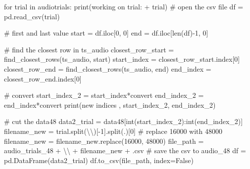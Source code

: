 \documentclass[
  letterpaper,
  DIV=11,
  numbers=noendperiod]{scrreprt}
\newenvironment{Shaded}{\begin{snugshade}}{\end{snugshade}}
\newcommand{\BuiltInTok}[1]{\textcolor[rgb]{0.00,0.23,0.31}{#1}}
\newcommand{\CharTok}[1]{\textcolor[rgb]{0.13,0.47,0.30}{#1}}
\newcommand{\CommentTok}[1]{\textcolor[rgb]{0.37,0.37,0.37}{#1}}
\newcommand{\ControlFlowTok}[1]{\textcolor[rgb]{0.00,0.23,0.31}{#1}}
\newcommand{\DecValTok}[1]{\textcolor[rgb]{0.68,0.00,0.00}{#1}}
\newcommand{\KeywordTok}[1]{\textcolor[rgb]{0.00,0.23,0.31}{#1}}
\newcommand{\NormalTok}[1]{\textcolor[rgb]{0.00,0.23,0.31}{#1}}
\newcommand{\OperatorTok}[1]{\textcolor[rgb]{0.37,0.37,0.37}{#1}}
\newcommand{\StringTok}[1]{\textcolor[rgb]{0.13,0.47,0.30}{#1}}
\newcommand{\VariableTok}[1]{\textcolor[rgb]{0.07,0.07,0.07}{#1}}
\begin{document}
\begin{Shaded}
\begin{Highlighting}[]
    \ControlFlowTok{for}\NormalTok{ trial }\KeywordTok{in}\NormalTok{ audiotrials:}
        \BuiltInTok{print}\NormalTok{(}\StringTok{\textquotesingle{}working on trial: \textquotesingle{}} \OperatorTok{+}\NormalTok{ trial)}
        \CommentTok{\# open the csv file}
\NormalTok{        df }\OperatorTok{=}\NormalTok{ pd.read\_csv(trial)}

        \CommentTok{\# first and last value}
\NormalTok{        start }\OperatorTok{=}\NormalTok{ df.iloc[}\DecValTok{0}\NormalTok{, }\DecValTok{0}\NormalTok{]}
\NormalTok{        end }\OperatorTok{=}\NormalTok{ df.iloc[}\BuiltInTok{len}\NormalTok{(df)}\OperatorTok{{-}}\DecValTok{1}\NormalTok{, }\DecValTok{0}\NormalTok{]}

        \CommentTok{\# find the closest row in ts\_audio}
\NormalTok{        closest\_row\_start }\OperatorTok{=}\NormalTok{ find\_closest\_rows(ts\_audio, start)}
\NormalTok{        start\_index }\OperatorTok{=}\NormalTok{ closest\_row\_start.index[}\DecValTok{0}\NormalTok{]    }
\NormalTok{        closest\_row\_end }\OperatorTok{=}\NormalTok{ find\_closest\_rows(ts\_audio, end)}
\NormalTok{        end\_index }\OperatorTok{=}\NormalTok{ closest\_row\_end.index[}\DecValTok{0}\NormalTok{]}

        \CommentTok{\# convert}
\NormalTok{        start\_index\_2 }\OperatorTok{=}\NormalTok{ start\_index}\OperatorTok{*}\NormalTok{convert}
\NormalTok{        end\_index\_2 }\OperatorTok{=}\NormalTok{ end\_index}\OperatorTok{*}\NormalTok{convert}
        \BuiltInTok{print}\NormalTok{(}\StringTok{\textquotesingle{}new indices \textquotesingle{}}\NormalTok{, start\_index\_2, end\_index\_2)}

        \CommentTok{\# cut the data48}
\NormalTok{        data2\_trial }\OperatorTok{=}\NormalTok{ data48[}\BuiltInTok{int}\NormalTok{(start\_index\_2):}\BuiltInTok{int}\NormalTok{(end\_index\_2)]}
\NormalTok{        filename\_new }\OperatorTok{=}\NormalTok{ trial.split(}\StringTok{\textquotesingle{}}\CharTok{\textbackslash{}\textbackslash{}}\StringTok{\textquotesingle{}}\NormalTok{)[}\OperatorTok{{-}}\DecValTok{1}\NormalTok{].split(}\StringTok{\textquotesingle{}.\textquotesingle{}}\NormalTok{)[}\DecValTok{0}\NormalTok{]}
        \CommentTok{\# replace 16000 with 48000}
\NormalTok{        filename\_new }\OperatorTok{=}\NormalTok{ filename\_new.replace(}\StringTok{\textquotesingle{}16000\textquotesingle{}}\NormalTok{, }\StringTok{\textquotesingle{}48000\textquotesingle{}}\NormalTok{)}
\NormalTok{        file\_path }\OperatorTok{=}\NormalTok{ audio\_trials\_48 }\OperatorTok{+} \StringTok{\textquotesingle{}}\CharTok{\textbackslash{}\textbackslash{}}\StringTok{\textquotesingle{}} \OperatorTok{+}\NormalTok{ filename\_new }\OperatorTok{+} \StringTok{\textquotesingle{}.csv\textquotesingle{}}
        \CommentTok{\# save the csv to audio\_48}
\NormalTok{        df }\OperatorTok{=}\NormalTok{ pd.DataFrame(data2\_trial)}
\NormalTok{        df.to\_csv(file\_path, index}\OperatorTok{=}\VariableTok{False}\NormalTok{)}


\end{Highlighting}
\end{Shaded}
\end{document}
